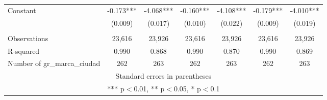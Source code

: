 \begin{tabular}{lcccccc}
Constant & -0.173*** & -4.068*** & -0.160*** & -4.108*** & -0.179*** & -4.010*** \\
 & (0.009) & (0.017) & (0.010) & (0.022) & (0.009) & (0.019) \\
 &  &  &  &  &  &  \\
Observations & 23,616 & 23,926 & 23,616 & 23,926 & 23,616 & 23,926 \\
R-squared & 0.990 & 0.868 & 0.990 & 0.870 & 0.990 & 0.869 \\
 Number of gr\_marca\_ciudad & 262 & 263 & 262 & 263 & 262 & 263 \\ \hline
\multicolumn{7}{c}{ Standard errors in parentheses} \\
\multicolumn{7}{c}{ *** p$<$0.01, ** p$<$0.05, * p$<$0.1} \\
\end{tabular}
